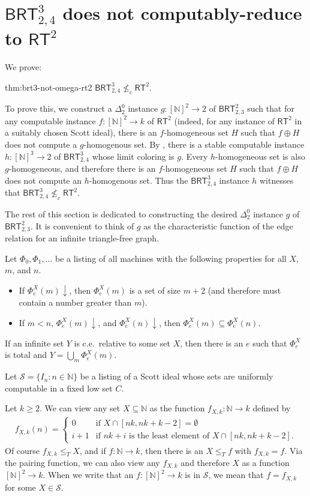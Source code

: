 \documentclass{article}
\def\Sc{\mathcal{S}}
\newcommand{\converge}{\!\!\downarrow}
\newcommand{\RT}[0]{\mathsf{RT}}
\newcommand{\BRT}[0]{\mathsf{BRT}}
\newcommand{\NN}[0]{\mathbb{N}}
\numberwithin{theorem}{section}
\begin{document}
\section{$\BRT^3_{2,4}$ does not computably-reduce to $\RT^2$}

We prove:

\begin{reptheorem}{thm:brt3-not-omega-rt2}
$\BRT^3_{2,4} \not \leq_c \RT^2$.
\end{reptheorem}

To prove this, we construct a $\Delta^0_2$ instance $g : [\NN]^2 \to 2$ of $\BRT^2_{2,3}$ such that for any computable instance $f : [\NN]^2 \to k$ of $\RT^2$ (indeed, for any instance of $\RT^2$ in a suitably chosen Scott ideal), there is an $f$-homogeneous set $H$ such that $f \oplus H$ does not compute a $g$-homogenous set.  By , there is a stable computable instance $h : [\NN]^3 \to 2$ of $\BRT^3_{2,4}$ whose limit coloring is $g$.  Every $h$-homogeneous set is also $g$-homogeneous, and therefore there is an $f$-homogeneous set $H$ such that $f \oplus H$ does not compute an $h$-homogenous set.  Thus the $\BRT^3_{2,4}$ instance $h$ witnesses that $\BRT^3_{2,4} \not \leq_c \RT^2$.

The rest of this section is dedicated to constructing the desired $\Delta^0_2$ instance $g$ of $\BRT^2_{2,3}$.  It is convenient to think of $g$ as the characteristic function of the edge relation for an infinite triangle-free graph.

Let $\Phi_0, \Phi_1, \dots$ be a listing of all machines with the following properties for all $X$, $m$, and $n$.
\begin{itemize}
\item If $\Phi_e^X(m)\converge$, then $\Phi_e^X(m)$ is a set of size $m+2$ (and therefore must contain a number greater than $m$).
\item If $m < n$, $\Phi_e^X(m)\converge$, and $\Phi_e^X(n)\converge$, then $\Phi_e^X(m) \subseteq \Phi_e^X(n)$.
\end{itemize}
If an infinite set $Y$ is c.e.\ relative to some set $X$, then there is an $e$ such that $\Phi_e^X$ is total and $Y = \bigcup_m \Phi_e^X(m)$.

Let $\Sc = \{I_n : n \in \NN\}$ be a listing of a Scott ideal whose sets are uniformly computable in a fixed low set $C$.

Let $k \geq 2$.  We can view any set $X \subseteq \NN$ as the function $f_{X,k} : \NN \to k$ defined by
\begin{align*}
f_{X,k}(n) = 
\begin{cases}
0 & \text{if $X \cap [nk, nk+k-2] = \emptyset$}\\
i+1 & \text{if $nk+i$ is the least element of $X \cap [nk, nk+k-2]$}.
\end{cases}
\end{align*}
Of course $f_{X,k} \leq_T X$, and if $f : \NN \to k$, then there is an $X \leq_T f$ with $f_{X,k} = f$.  Via the pairing function, we can also view any $f_{X,k}$ and therefore $X$ as a function $[\NN]^2 \to k$.  When we write that an $f : [\NN]^2 \to k$ is in $\Sc$, we mean that $f = f_{X,k}$ for some $X \in \Sc$.
\end{document}
